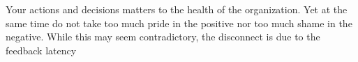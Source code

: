Your actions and decisions matters to the health of the organization. Yet at the same time do not take too much pride in the positive nor too much shame in the negative. While this may seem contradictory, the disconnect is due to the feedback latency
